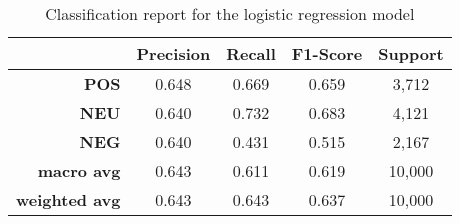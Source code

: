 \begin{table}[!ht]
	\centering
	\begin{tabular}{rcccc}
		\toprule
 & \textbf{Precision} & \textbf{Recall} & \textbf{F1-Score} & \textbf{Support}\\
 \midrule
\textbf{POS} & 0.648 & 0.669 & 0.659 & 3,712\\
\textbf{NEU} & 0.640 & 0.732 & 0.683 & 4,121\\
\textbf{NEG} & 0.640 & 0.431 & 0.515 & 2,167\\
\midrule
\textbf{macro avg} & 0.643 & 0.611 & 0.619 & 10,000\\
\textbf{weighted avg} & 0.643 & 0.643 & 0.637 & 10,000\\
		\bottomrule
	\end{tabular}
	\caption{Classification report for the logistic regression model}
	\label{table-classification-report}
\end{table}